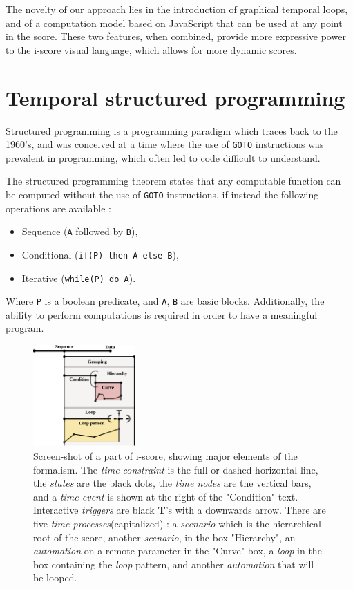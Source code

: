 \documentclass{article}
\newcommand{\scenario}{\textit{scenario}\xspace}
\newcommand{\Loop}{\textit{loop}\xspace}
\newcommand{\states}{\textit{states}\xspace}
\newcommand{\timeevent}{\textit{time event}\xspace}
\newcommand{\timenodes}{\textit{time nodes}\xspace}
\newcommand{\timeconstraint}{\textit{time constraint}\xspace}
\newcommand{\timeprocesses}{\textit{time processes}\xspace}
\newcommand{\automation}{\textit{automation}\xspace}
\newcommand{\triggers}{\textit{triggers}\xspace}
\begin{document}
The novelty of our approach lies in the introduction of graphical temporal loops, and of a computation model 
based on JavaScript that can be used at any point in the score. 
These two features, when combined, provide more expressive power to the i-score visual language, 
which allows for more dynamic scores.

\section{Temporal structured programming}
Structured programming is a programming paradigm which traces 
back to the 1960's, and was conceived at a time where the use of \lstinline{GOTO}
instructions was prevalent in programming, which often led to code difficult to understand.

The structured programming theorem\cite{bohm1966flow,mills1972mathematical} states that any computable function can be computed 
without the use of \lstinline{GOTO} instructions, if instead the following operations are available : 
\begin{itemize}
    \item Sequence (\lstinline{A} followed by \lstinline{B}), 
    \item Conditional (\lstinline{if(P) then A else B}), 
    \item Iterative (\lstinline{while(P) do A}).
\end{itemize}

Where \lstinline|P| is a boolean predicate, and \lstinline|A|, \lstinline|B| are basic blocks.
Additionally, the ability to perform computations is required in order to have a meaningful program.

\begin{figure}
    \centering
    \includegraphics[width=0.35\textwidth]{images/hierarchy.eps}
    \caption{Screen-shot of a part of i-score, showing major elements of the formalism. The \timeconstraint is the full or dashed horizontal line, the \states are the black dots, the \timenodes are the vertical bars, and a \timeevent is shown at the right of the "Condition" text. Interactive \triggers are black \textbf{T}'s with a downwards arrow. There are five \timeprocesses (capitalized) : a \scenario which is the hierarchical root of the score, another \scenario, in the box "Hierarchy", an \automation on a remote parameter in the "Curve" box, a \Loop in the box containing the \Loop pattern, and another \automation that will be looped.}
    \label{fig.hierarchy}
\end{figure}
\end{document}
